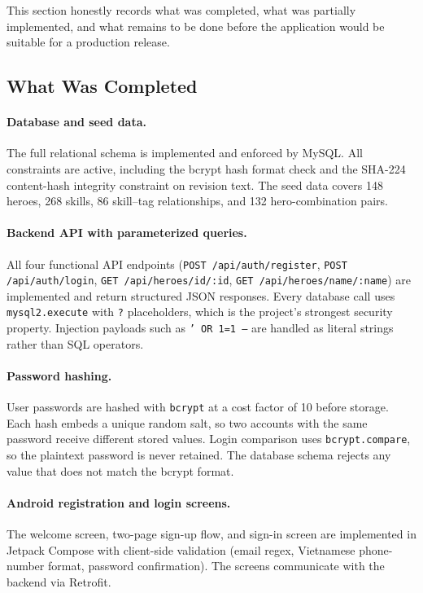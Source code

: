 This section honestly records what was completed, what was partially implemented, and what remains to be done before the application would be suitable for a production release.

\subsection{What Was Completed}

\paragraph{Database and seed data.}
The full relational schema is implemented and enforced by MySQL. All constraints are active, including the bcrypt hash format check and the SHA-224 content-hash integrity constraint on revision text. The seed data covers 148 heroes, 268 skills, 86 skill--tag relationships, and 132 hero-combination pairs.

\paragraph{Backend API with parameterized queries.}
All four functional API endpoints (\texttt{POST /api/auth/register}, \texttt{POST /api/auth/login}, \texttt{GET /api/heroes/id/:id}, \texttt{GET /api/heroes/name/:name}) are implemented and return structured JSON responses. Every database call uses \texttt{mysql2.execute} with \texttt{?} placeholders, which is the project's strongest security property. Injection payloads such as \texttt{' OR 1=1 --} are handled as literal strings rather than SQL operators.

\paragraph{Password hashing.}
User passwords are hashed with \texttt{bcrypt} at a cost factor of 10 before storage. Each hash embeds a unique random salt, so two accounts with the same password receive different stored values. Login comparison uses \texttt{bcrypt.compare}, so the plaintext password is never retained. The database schema rejects any value that does not match the bcrypt format.

\paragraph{Android registration and login screens.}
The welcome screen, two-page sign-up flow, and sign-in screen are implemented in Jetpack Compose with client-side validation (email regex, Vietnamese phone-number format, password confirmation). The screens communicate with the backend via Retrofit.

